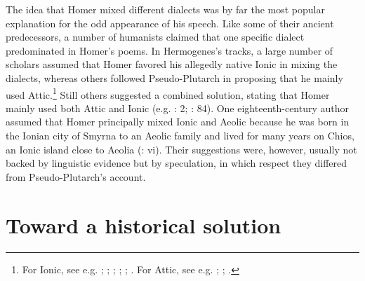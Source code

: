 The idea that Homer mixed different dialects was by far the most popular explanation for the odd appearance of his speech. Like some of their ancient predecessors, a number of humanists claimed that one specific dialect predominated in Homer’s poems. In Hermogenes’s tracks, a large number of scholars assumed that Homer favored his allegedly native Ionic in mixing the dialects, whereas others followed Pseudo-Plutarch in proposing that he mainly used Attic.\footnote{For Ionic, see e.g. \citet[47\textsc{\textsuperscript{r}}]{Da1509}; \citet[215]{Ringelbergh1541}; \citet[167]{Labbe1639}; \citet[\textsc{b.3}\textsc{\textsuperscript{v}}]{KirchmaierCrusius1684}; \citet[b.2\textsc{\textsuperscript{r}}, 334]{Nibbe1725}; \citet[161]{Gesner1774}. For Attic, see e.g. \citet[\textsc{f.}v\textsc{\textsuperscript{r}}]{Codro1502}; \citet[96\textsc{\textsuperscript{r}}]{Waser1610}; \citet[514]{Fabricius1711}.} Still others suggested a combined solution, stating that Homer mainly used both Attic and Ionic (e.g. \citealt{Schmidt1604}: 2; \citealt{Rhenius1626}: 84). One eighteenth-century author assumed that Homer principally mixed Ionic and Aeolic because he was born in the Ionian city of Smyrna to an Aeolic family and lived for many years on Chios, an Ionic island close to Aeolia (\citealt{Reynolds1752}: vi). Their suggestions were, however, usually not backed by linguistic evidence but by speculation, in which respect they differed from Pseudo-Plutarch’s account.

\section{Toward a historical solution}\label{sec:4.3}

